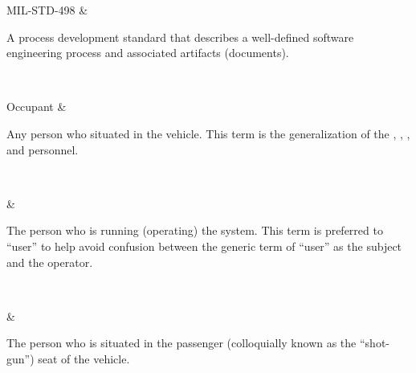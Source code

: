 

MIL-STD-498      & \begin{minipage}{\GlossaryColumnWidth}{%
A process development standard that describes a well-defined software engineering process and associated artifacts (documents).
}\end{minipage}\\ \hline%

Occupant      & \begin{minipage}{\GlossaryColumnWidth}{%
Any person who situated in the vehicle. 
This term is the generalization of the \VIP, \Operator, \Passenger, and \Driver personnel.
}\end{minipage}\\ \hline%

\Operator      & \begin{minipage}{\GlossaryColumnWidth}{%
The person who is running (operating) the system. 
This term is preferred to ``user'' to help avoid confusion between the generic term of ``user'' as the subject and the operator.
}\end{minipage}\\ \hline%

\Passenger      & \begin{minipage}{\GlossaryColumnWidth}{%
The person who is situated in the passenger (colloquially known as the ``shot-gun'') seat of the vehicle. 
}\end{minipage}\\ \hline%


